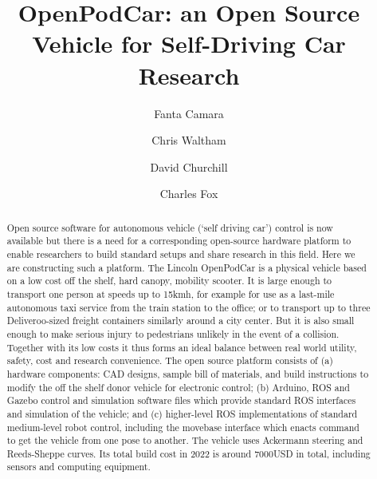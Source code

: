 \documentclass[a4paper]{article}
\title{OpenPodCar: an Open Source Vehicle for Self-Driving Car Research}
\author[1,2]{Fanta Camara}
\author[2]{Chris Waltham}
\author[2]{David Churchill}
\author[1,2]{Charles Fox}
\affil[1]{Institute for Transport Studies, University of Leeds, UK}
\affil[2]{School of Computer Science, University of Lincoln, UK}
\begin{document}
\maketitle


\begin{abstract}
Open source software for autonomous vehicle (`self driving car’) control is now available but there is a need for a corresponding open-source hardware platform to enable researchers to build standard setups and share research in this field.   Here we are constructing such a platform. The Lincoln OpenPodCar is a physical vehicle based on a low cost off the shelf, hard canopy, mobility scooter.  It is large enough to transport one person at speeds up to 15kmh, for example for use as a last-mile autonomous taxi service from the train station to the office; or to transport up to three Deliveroo-sized freight containers similarly around a city center. But it is also small enough to make serious injury to pedestrians unlikely in the event of a collision.  Together with its low costs it thus forms an ideal balance between real world utility, safety, cost and research convenience.  The open source platform consists of (a) hardware components: CAD designs, sample bill of materials, and build instructions to modify the off the shelf donor vehicle for electronic control; (b) Arduino, ROS and Gazebo control and simulation software files which provide standard ROS interfaces and simulation of the vehicle; and (c) higher-level ROS implementations of standard medium-level robot control, including the movebase interface which enacts command to get the vehicle from one pose to another. The vehicle uses Ackermann steering and Reeds-Sheppe curves. Its total build cost in 2022 is around 7000USD in total, including sensors and computing equipment.
\end{abstract}
\end{document}
